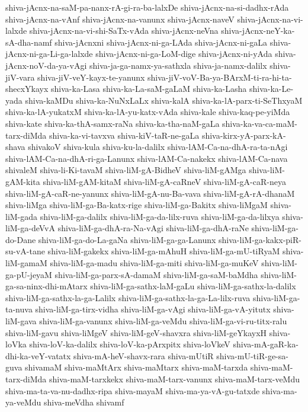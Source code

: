 {shiva-jAcnx-na-saM-pa-nanx-rA-gi-ra-ba-lalxDe
shiva-jAcnx-na-si-dadhx-rAda
shiva-jAcnx-na-vAnf
shiva-jAcnx-na-vanunx
shiva-jAcnx-naveV
shiva-jAcnx-na-vi-lalxde
shiva-jAcnx-na-vi-shi-SaTx-vAda
shiva-jAcnx-neVna
shiva-jAcnx-neY-ka-sA-dha-namf
shiva-jAcnxni
shiva-jAcnx-ni-ga-LAda
shiva-jAcnx-ni-gaLa
shiva-jAcnx-ni-ga-Li-ga-lalxde
shiva-jAcnx-ni-ga-LoM-dige
shiva-jAcnx-ni-yAda
shiva-jAcnx-noV-da-ya-vAgi
shiva-ja-ga-namx-ya-sathxla
shiva-ja-namx-dalilx
shiva-jiV-vara
shiva-jiV-veY-kayx-te-yanunx
shiva-jiV-voV-Ba-ya-BArxM-ti-ra-hi-ta-shecxYkayx
shiva-ka-Lasa
shiva-ka-La-saM-gaLaM
shiva-ka-Lasha
shiva-ka-Le-yada
shiva-kaMDu
shiva-ka-NuNxLaLx
shiva-kalA
shiva-ka-lA-parx-ti-SeThxyaM
shiva-ka-lA-yukatxM
shiva-ka-lA-yu-katx-vAda
shiva-kale
shiva-kaq-pe-yiMda
shiva-kate
shiva-ka-thA-samx-raNa
shiva-ka-tha-naM-gaLa
shiva-ka-va-ca-maM-tarx-diMda
shiva-ka-vi-tavxva
shiva-kiV-taR-ne-gaLa
shiva-kirx-yA-parx-kA-shava
shivakoV
shiva-kula
shiva-ku-la-dalilx
shiva-lAM-Ca-na-dhA-ra-ta-nAgi
shiva-lAM-Ca-na-dhA-ri-ga-Lanunx
shiva-lAM-Ca-nakekx
shiva-lAM-Ca-nava
shivaleM
shiva-li-Ki-tavaM
shiva-liM-gA-BidheV
shiva-liM-gAMga
shiva-liM-gAM-kita
shiva-liM-gAM-kitaM
shiva-liM-gA-caRneV
shiva-liM-gA-caR-neya
shiva-liM-gA-caR-ne-yanunx
shiva-liM-gA-nu-Ba-vava
shiva-liM-gA-rA-dhanaM
shiva-liMga
shiva-liM-ga-Ba-katx-rige
shiva-liM-ga-Bakitx
shiva-liMgaM
shiva-liM-gada
shiva-liM-ga-dalilx
shiva-liM-ga-da-lilx-ruva
shiva-liM-ga-da-lilxya
shiva-liM-ga-deVvA
shiva-liM-ga-dhA-ra-Na-vAgi
shiva-liM-ga-dhA-raNe
shiva-liM-ga-do-Dane
shiva-liM-ga-do-La-gaNa
shiva-liM-ga-ga-Lanunx
shiva-liM-ga-kakx-piR-su-vA-tane
shiva-liM-gakekx
shiva-liM-ga-mAhuH
shiva-liM-ga-mU-tiRyaM
shiva-liM-gamaM
shiva-liM-ga-madu
shiva-liM-ga-miti
shiva-liM-ga-muKeV
shiva-liM-ga-pU-jeyaM
shiva-liM-ga-parx-sA-damaM
shiva-liM-ga-saM-baMdha
shiva-liM-ga-sa-ninx-dhi-mAtarx
shiva-liM-ga-sathx-laM-gaLu
shiva-liM-ga-sathx-la-dalilx
shiva-liM-ga-sathx-la-ga-Lalilx
shiva-liM-ga-sathx-la-ga-La-lilx-ruva
shiva-liM-ga-ta-nuva
shiva-liM-ga-tirx-vidha
shiva-liM-ga-vAgi
shiva-liM-ga-vA-yitutx
shiva-liM-gava
shiva-liM-ga-vanunx
shiva-liM-ga-veMdu
shiva-liM-ga-vi-ru-titx-ralu
shiva-liM-gavu
shiva-liMgeV
shiva-liM-geV-shavxra
shiva-liM-geYkayxH
shiva-loVka
shiva-loV-ka-dalilx
shiva-loV-ka-pArxpitx
shiva-loVkeV
shiva-mA-gaR-ka-dhi-ka-veY-vatatx
shiva-mA-heV-shavx-rara
shiva-mUtiR
shiva-mU-tiR-ge-sa-guva
shivamaM
shiva-maMtArx
shiva-maMtarx
shiva-maM-tarxda
shiva-maM-tarx-diMda
shiva-maM-tarxkekx
shiva-maM-tarx-vanunx
shiva-maM-tarx-veMdu
shiva-ma-ta-va-nu-dadhx-ripa
shiva-mayaM
shiva-ma-ya-vA-gu-tatxde
shiva-ma-ya-veMdu
shiva-meVdha
shivamf
}
